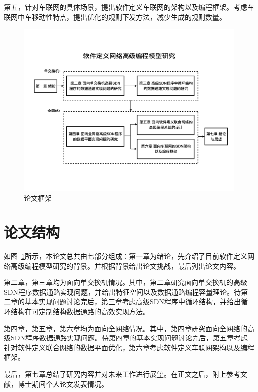 \documentclass{ctexart}
\begin{document}
第五，针对车联网的具体场景，提出软件定义车联网的架构以及编程框架。考虑车联网中车移动性特点，提出优化的规则下发方法，减少生成的规则数量。

\begin{figure}[h!]
	\centering
	\vspace{-0.1in}
	\includegraphics[scale = 0.45]{figures/intro-fig1.pdf}
	\vspace{-0.1in}
	\caption{论文框架}
	\vspace{-0.1in}
	\label{intro:fig1}
\end{figure}


\section{论文结构}

如图~\ref{intro:fig1}所示，本论文总共由七部分组成：第一章为绪论，先介绍了目前软件定义网络高级编程模型研究的背景。并根据背景给出论文挑战，最后列出论文内容。

第二章，第三章均为面向单交换机情况。其中，第二章研究面向单交换机的高级SDN程序数据通路实现问题，并给出特征空间以及数据通路编程容量理论。待第二章的基本实现问题讨论完后，第三章考虑高级SDN程序中循环结构，并给出循环结构在可定制结构数据通路的高效实现方法。

第四章，第五章，第六章均为面向全网络情况。其中，第四章研究面向全网络的高级SDN程序数据通路实现问题。待第四章的基本实现问题讨论完后，第五章考虑针对软件定义联合网络的数据平面优化，第六章考虑软件定义车联网架构以及编程框架。

最后，第七章总结了研究内容并对未来工作进行展望。在正文之后，附上参考文献，博士期间个人论文发表情况。
\end{document}
